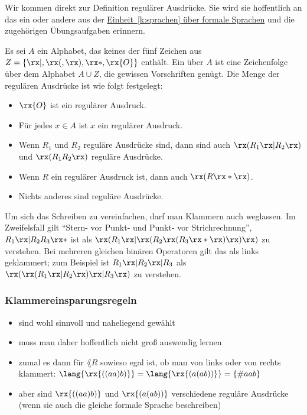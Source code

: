 Wir kommen direkt zur Definition regulärer Ausdrücke. Sie wird sie
hoffentlich an das ein oder andere aus der
\hyperref[k:sprachen]{Einheit~\ref{k:sprachen} über formale Sprachen}
und die zugehörigen Übungsaufgaben erinnern.

Es sei $A$ ein Alphabet, das keines der fünf Zeichen aus $Z=\{\rx|,
\rx(, \rx), \rx*, \rx{O}\}$ enthält.  Ein  über $A$ ist eine Zeichenfolge
über dem Alphabet $A\cup Z$, die gewissen Vorschriften genügt. Die
Menge der regulären Ausdrücke ist wie folgt festgelegt:
% 
\begin{itemize}
\item $\rx{O}$ ist ein regulärer Ausdruck.
\item Für jedes $x\in A$ ist $x$ ein regulärer Ausdruck.
\item Wenn $R_1$ und $R_2$ reguläre Ausdrücke sind, dann sind auch
  $\rx(R_1 \rx| R_2\rx)$ und $\rx(R_1R_2\rx)$ reguläre Ausdrücke.
\item Wenn $R$ ein regulärer Ausdruck ist, dann auch $\rx(R\rx*\rx)$.
\item Nichts anderes sind reguläre Ausdrücke.
\end{itemize}
% 
Um sich das Schreiben zu vereinfachen, darf man Klammern auch
weglassen. Im Zweifelsfall gilt "`Stern- vor Punkt- und Punkt- vor
Strichrechnung"', \dh $R_1 \rx| R_2R_3\rx*$ ist \zB als $\rx(R_1
\rx| \rx(R_2\rx(R_3\rx*\rx)\rx)\rx)$ zu verstehen. Bei mehreren
gleichen binären Operatoren gilt das als links geklammert; zum
Beispiel ist $R_1 \rx| R_2 \rx| R_3$ als $\rx( \rx(R_1 \rx| R_2\rx)
\rx| R_3 \rx)$ zu verstehen.

\begin{tutorium}
  \subsubsection*{Klammereinsparungsregeln}
  \begin{itemize}
  \item sind wohl sinnvoll und naheliegend gewählt
  \item muss man daher hoffentlich nicht groß auswendig lernen
  \item zumal es dann für $\lang{R}$ sowieso egal ist, ob man von
    links oder von rechts klammert: \zB
    $\lang{\rx{((aa)b)}}=\lang{\rx{(a(ab))}} = \{\#{aab}\}$
  \item aber sind $\rx{((aa)b)}$ und $\rx{(a(ab))}$ verschiedene
    reguläre Ausdrücke (wenn sie auch die gleiche formale Sprache
    beschreiben)
  \end{itemize}
\end{tutorium}

